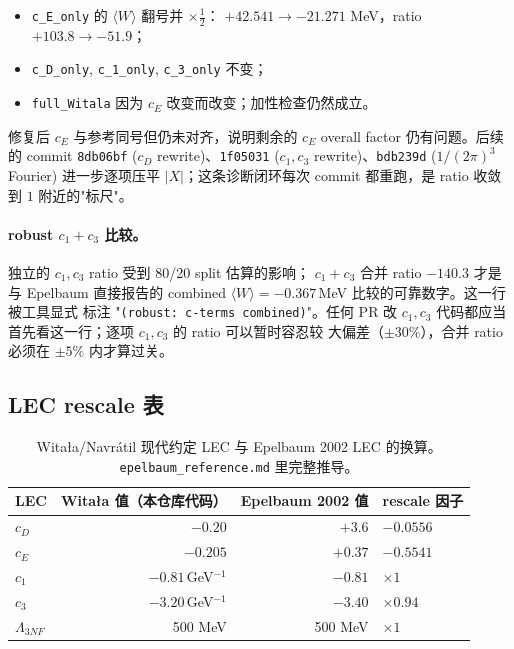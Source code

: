 \begin{itemize}
  \item \texttt{c\_E\_only} 的 \(\langle W\rangle\) 翻号并 \(\times \frac{1}{2}\)：
        \(+42.541 \to -21.271\) MeV，ratio \(+103.8 \to -51.9\)；
  \item \texttt{c\_D\_only}, \texttt{c\_1\_only}, \texttt{c\_3\_only} 不变；
  \item \texttt{full\_Witala} 因为 \(c_E\) 改变而改变；加性检查仍然成立。
\end{itemize}

修复后 \(c_E\) 与参考同号但仍未对齐，说明剩余的 \(c_E\) overall
factor 仍有问题。后续的 commit \texttt{8db06bf} (\(c_D\)
rewrite)、\texttt{1f05031} (\(c_1, c_3\) rewrite)、\texttt{bdb239d}
(\(1/(2\pi)^3\) Fourier) 进一步逐项压平 \(|X|\)；这条诊断闭环每次
commit 都重跑，是 ratio 收敛到 \(1\) 附近的"标尺"。

\paragraph{robust \(c_1+c_3\) 比较。}
独立的 \(c_1, c_3\) ratio 受到 80/20 split 估算的影响；
\(c_1+c_3\) 合并 ratio \(-140.3\) 才是与 Epelbaum 直接报告的 combined
\(\langle W\rangle = -0.367\)\,MeV 比较的可靠数字。这一行被工具显式
标注 "\texttt{(robust: c-terms combined)}"。任何 PR 改 \(c_1, c_3\)
代码都应当首先看这一行；逐项 \(c_1, c_3\) 的 ratio 可以暂时容忍较
大偏差（\(\pm 30\%\)），合并 ratio 必须在 \(\pm 5\%\) 内才算过关。

\subsection{LEC rescale 表}
\label{subsec:ch17-lec-rescale}

\begin{table}[h]
\centering
\caption{Witała/Navrátil 现代约定 LEC 与 Epelbaum 2002 LEC 的换算。
\texttt{epelbaum\_reference.md} 里完整推导。}
\label{tab:ch17-lec-rescale}
\begin{tabular}{lrrl}
\toprule
LEC & Witała 值（本仓库代码） & Epelbaum 2002 值 & rescale 因子 \\
\midrule
\(c_D\)  & \(-0.20\)              & \(+3.6\)         & \(-0.0556\) \\
\(c_E\)  & \(-0.205\)             & \(+0.37\)        & \(-0.5541\) \\
\(c_1\)  & \(-0.81\)\,GeV\(^{-1}\) & \(-0.81\)        & \(\times 1\) \\
\(c_3\)  & \(-3.20\)\,GeV\(^{-1}\) & \(-3.40\)        & \(\times 0.94\) \\
\(\Lambda_{3NF}\) & 500 MeV       & 500 MeV          & \(\times 1\) \\
\bottomrule
\end{tabular}
\end{table}

